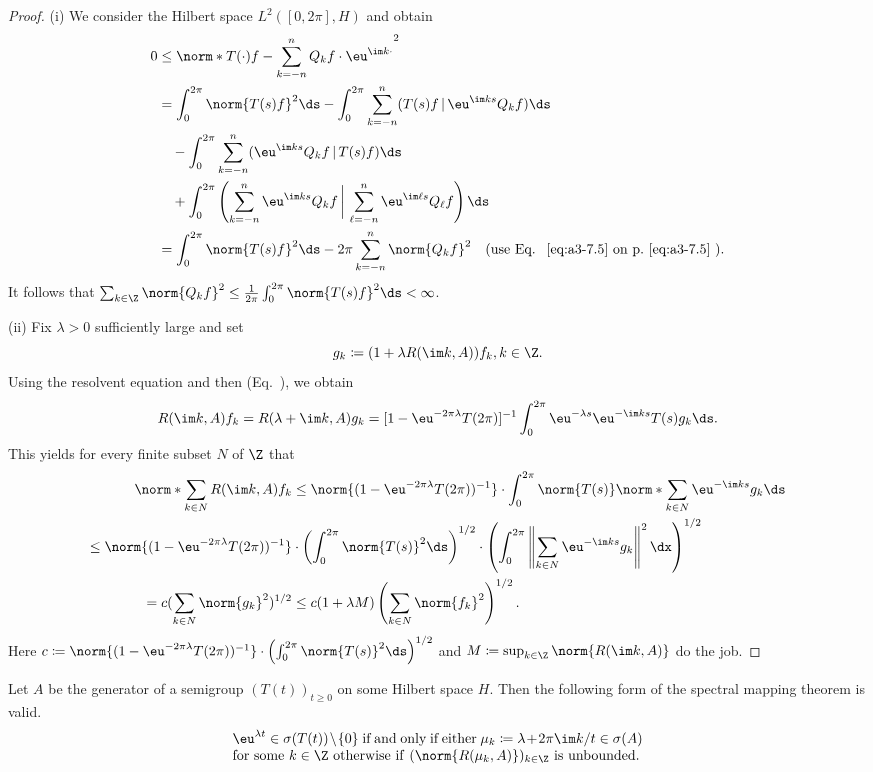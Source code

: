 \begin{proof}
(i) We consider the Hilbert space $L^{2}([0,2\pi],H)$ and obtain
\begin{align*}
0 &\leq \norm*{T(\cdot)f - \sum_{k=-n}^{n} Q_{k}f\cdot \eu^{\im k\cdot}}^{2} \\
&= \int_{0}^{2\pi} \norm{T(s)f}^{2} \ds 
   - \int_{0}^{2\pi} \sum_{k=-n}^{n} (T(s)f \,\vert\, \eu^{\im ks}Q_{k}f) \ds \\
&\quad - \int_{0}^{2\pi} \sum_{k=-n}^{n} (\eu^{\im ks}Q_{k}f  \,\vert\, T(s)f) \ds \\
&\quad + \int_{0}^{2\pi} \left(\sum_{k=-n}^{n} \eu^{\im ks}Q_{k}f
        \,\bigg\vert\,  \sum_{\ell=-n}^{n} \eu^{\im \ell s}Q_{\ell}f\right) \ds \\
&= \int_{0}^{2\pi} \norm{T(s)f}^{2} \ds - 2\pi\sum_{k=-n}^{n} \norm{Q_{k}f}^{2}
   \quad \text{(use Eq.~\myeqpageref{eq:a3-7.5})}.
\end{align*}
It follows that $\sum_{k\in\Z} \norm{Q_{k}f}^{2} \leq \frac{1}{2\pi}\int_{0}^{2\pi} \norm{T(s)f}^{2} \ds < \infty$.

(ii) Fix $\lambda > 0$ sufficiently large and set 
\[
g_{k}\coloneqq (1 + \lambda R(\im k,A))f_{k}, k \in \Z .
\]
Using the resolvent equation and then (Eq.~), we obtain
\[
R(\im k,A)f_{k} = R(\lambda + \im k,A)g_{k} = [1 - \eu^{-2\pi\lambda}T(2\pi)]^{-1}\int_{0}^{2\pi} \eu^{-\lambda s}\eu^{-\im ks}T(s)g_{k} \ds .
\]
This yields for every finite subset $N$ of\/ $\Z$ that
\begin{align*}
	\norm*{\sum_{k\in N} R(\im k,A)f_{k}} & 
		\leq \norm{(1 - \eu^{-2\pi\lambda}T(2\pi))^{-1}}\cdot\int_{0}^{2\pi} \norm{T(s)} 
			\norm*{\sum_{k\in N} \eu^{-\im ks}g_{k}} \ds
\\
	\leq \norm{(1 - \eu^{-2\pi\lambda}T(2\pi))^{-1}} & \cdot 
	\left(\int_{0}^{2\pi}\norm{T(s)}^{2} \ds\right)^{1/2} \cdot \left(\int_{0}^{2\pi}\left\|\sum_{k\in N} 
	\eu^{-\im ks}g_{k}\right\|^{2} \dx \right)^{1/2}
\\
	= c(\sum_{k\in N} \norm{g_{k}}^{2})^{1/2} & \leq c(1 + \lambda M)\left(\sum_{k\in N} \norm{f_{k}}^{2}\right)^{1/2} .
\end{align*}
Here $c\coloneqq \norm{(1 - \eu^{-2\pi\lambda}T(2\pi))^{-1}}\cdot\left(\int_{0}^{2\pi}\norm{T(s)}^{2} \ds\right)^{1/2}$ and $M\coloneqq \sup_{k\in\Z}\norm{R(\im k,A)}$ do the job.
\end{proof}
\begin{theorem}\label{thm:a3-7.10}
%
Let $A$ be the generator of a semigroup $(T(t))_{t\geq 0}$ on some Hilbert space $H$.
Then the following form of the spectral mapping theorem is valid.
\[
\begin{minipage}{.85\textwidth}
	$ \eu^{\lambda t} \in \sigma(T(t))\setminus\{0\} $ if and only if either 
	$\mu_{k}\coloneqq \lambda + 2\pi\im  k/t \in \sigma(A)$ for some  $k \in \Z$
	otherwise  if\/ $(\norm{R(\mu_{k},A)})_{k\in\Z}$ is unbounded.
\end{minipage}
\]
\end{theorem}
